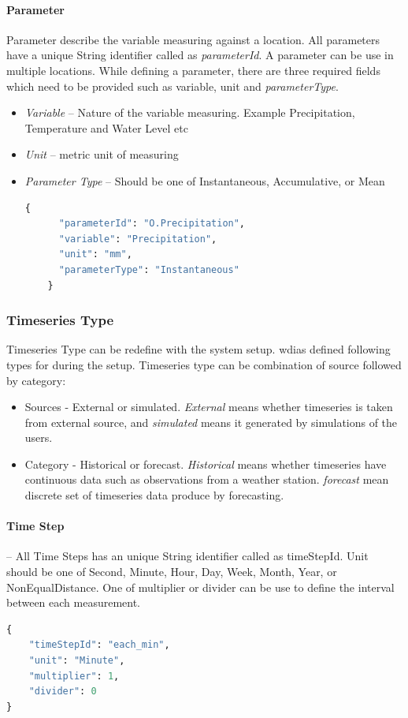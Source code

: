 \paragraph{Parameter}
Parameter describe the variable measuring against a location. All parameters have a unique String identifier called as \textit{parameterId}. A parameter can be use in multiple locations.
While defining a parameter, there are three required fields which need to be provided such as variable, unit and \textit{parameterType}.
\begin{itemize}  
  \item \emph{Variable} -- Nature of the variable measuring. Example Precipitation, Temperature and Water Level etc
  \item \emph{Unit} -- metric unit of measuring
  \item \emph{Parameter Type} -- Should be one of Instantaneous, Accumulative, or Mean
  \begin{lstlisting}[language=Python]
    {
      "parameterId": "O.Precipitation",
      "variable": "Precipitation",
      "unit": "mm",
      "parameterType": "Instantaneous"
    }
  \end{lstlisting}
\end{itemize}

\subsubsection{Timeseries Type}
Timeseries Type can be redefine with the system setup. \acrshort{wdias} defined following types for during the setup. Timeseries type can be combination of source followed by category:
\begin{itemize}
  \item Sources - External or simulated. \emph{External} means whether timeseries is taken from external source, and \emph{simulated} means it generated by simulations of the users.
  \item Category - Historical or forecast. \emph{Historical} means whether timeseries have continuous data such as observations from a weather station. \emph{forecast} mean discrete set of timeseries data produce by forecasting.
\end{itemize}

\paragraph{Time Step}-- All Time Steps has an unique String identifier called as timeStepId. Unit should be one of Second, Minute, Hour, Day, Week, Month, Year, or NonEqualDistance. One of multiplier or divider can be use to define the interval between each measurement.
\begin{lstlisting}[language=Python]
{
    "timeStepId": "each_min",
    "unit": "Minute",
    "multiplier": 1,
    "divider": 0
}
\end{lstlisting}

